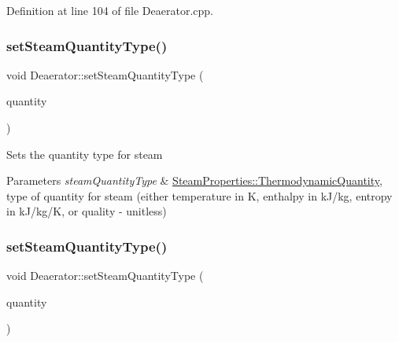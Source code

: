 Definition at line 104 of file Deaerator.\+cpp.

\mbox{\label{class_deaerator_a1aa3b3de064d148479af9576e717b6c2}} 
\subsubsection{\texorpdfstring{set\+Steam\+Quantity\+Type()}{setSteamQuantityType()}\hspace{0.1cm}{\footnotesize\ttfamily [1/3]}}
{\footnotesize\ttfamily void Deaerator\+::set\+Steam\+Quantity\+Type (\begin{DoxyParamCaption}\item[{\hyperlink{class_steam_properties_ae0294bedf7d178c2d8fb6aed0f62fbff}{Steam\+Properties\+::\+Thermodynamic\+Quantity}}]{quantity }\end{DoxyParamCaption})}

Sets the quantity type for steam 
\begin{DoxyParams}{Parameters}
{\em steam\+Quantity\+Type} & \hyperlink{class_steam_properties_ae0294bedf7d178c2d8fb6aed0f62fbff}{Steam\+Properties\+::\+Thermodynamic\+Quantity}, type of quantity for steam (either temperature in K, enthalpy in k\+J/kg, entropy in k\+J/kg/K, or quality -\/ unitless) \\
\hline
\end{DoxyParams}
\mbox{\label{class_deaerator_a1aa3b3de064d148479af9576e717b6c2}} 
\subsubsection{\texorpdfstring{set\+Steam\+Quantity\+Type()}{setSteamQuantityType()}\hspace{0.1cm}{\footnotesize\ttfamily [2/3]}}
{\footnotesize\ttfamily void Deaerator\+::set\+Steam\+Quantity\+Type (\begin{DoxyParamCaption}\item[{\hyperlink{class_steam_properties_ae0294bedf7d178c2d8fb6aed0f62fbff}{Steam\+Properties\+::\+Thermodynamic\+Quantity}}]{quantity }\end{DoxyParamCaption})}

